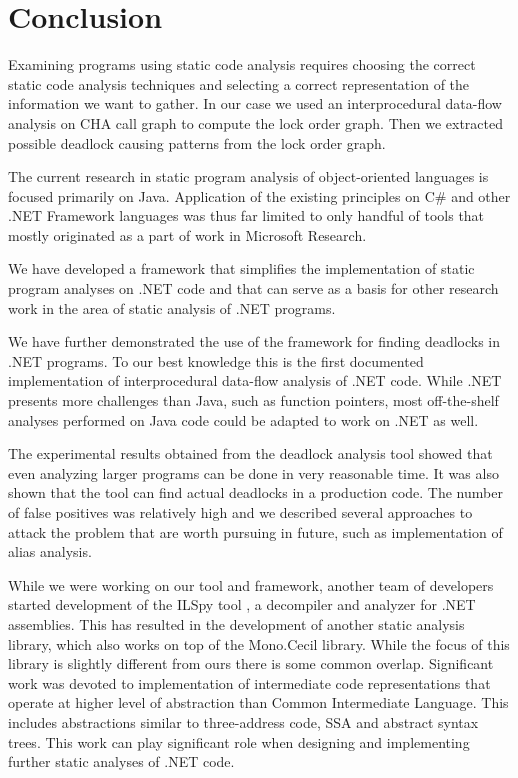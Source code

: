 \chapter{Conclusion}

Examining programs using static code analysis requires choosing the correct static code analysis techniques and selecting a correct representation of the information we want to gather. In our case we used an interprocedural data-flow analysis on CHA call graph to compute the lock order graph. Then we extracted possible deadlock causing patterns from the lock order graph.

The current research in static program analysis of object-oriented languages is focused primarily on Java. Application of the existing principles on C\# and other .NET Framework languages was thus far limited to only handful of tools that mostly originated as a part of work in Microsoft Research.

We have developed a framework that simplifies the implementation of static program analyses on .NET code and that can serve as a basis for other research work in the area of static analysis of .NET programs.

We have further demonstrated the use of the framework for finding deadlocks in .NET programs. To our best knowledge this is the first documented implementation of interprocedural data-flow analysis of .NET code. While .NET presents more challenges than Java, such as function pointers, most off-the-shelf analyses performed on Java code could be adapted to work on .NET as well.

The experimental results obtained from the deadlock analysis tool showed that even analyzing larger programs can be done in very reasonable time. It was also shown that the tool can find actual deadlocks in a production code. The number of false positives was relatively high and we described several approaches to attack the problem that are worth pursuing in future, such as implementation of alias analysis.

While we were working on our tool and framework, another team of developers started development of the ILSpy tool \citep{ILSpy}, a decompiler and analyzer for .NET assemblies. This has resulted in the development of another static analysis library, which also works on top of the Mono.Cecil library. While the focus of this library is slightly different from ours there is some common overlap. Significant work was devoted to implementation of intermediate code representations that operate at higher level of abstraction than Common Intermediate Language. This includes abstractions similar to three-address code, SSA and abstract syntax trees. This work can play significant role when designing and implementing further static analyses of .NET code.
